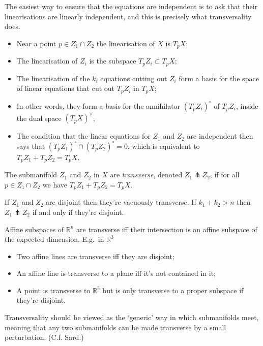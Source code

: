\documentclass[a4paper,11pt]{article}
\begin{document}
	The easiest way to ensure that the equations are independent is to ask that their linearisations are linearly independent, and this is precisely what transversality does.

	\begin{itemize}
		\item Near a point $p \in Z_1 \cap Z_2$ the linearisation of $X$ is $T_p X$;
		\item The linearisation of $Z_i$ is the subspace $T_p Z_i \subset T_p X$;
		\item The linearisation of the $k_i$ equations cutting out $Z_i$ form a basis for the space of linear equations that cut out $T_p Z_i$ in $T_p X$;
		\item In other words, they form a basis for the annihilator $(T_p Z_i)^\circ$ of $T_p Z_i$, inside the dual space $(T_p X)^{\vee}$;
		\item The condition that the linear equations for $Z_1$ and $Z_2$ are independent then says that $(T_p Z_1)^\circ \cap (T_p Z_2)^\circ = 0$, which is equivalent to $T_p Z_1 + T_p Z_2 = T_p X$.  
	\end{itemize}
	\begin{defi}
		The submanifold $Z_1$ and $Z_2$ in $X$ are \emph{transverse}, denoted $Z_1 \pitchfork Z_2$, if for all $p \in Z_1 \cap Z_2$ we have $T_p Z_1 + T_p Z_2 = T_p X$.
	\end{defi}

	\begin{ex}
		If $Z_1$ and $Z_2$ are disjoint then they're vacuously transverse. If $k_1 + k_2 > n$ then $Z_1 \pitchfork Z_2$ if and only if they're disjoint.
	\end{ex}

	\begin{ex}
		Affine subspaces of $\mathbb{R}^n$ are transverse iff their intersection is an affine subspace of the expected dimension. E.g.\ in $\mathbb{R}^3$
		\begin{itemize}
			\item Two affine lines are transverse iff they are disjoint;
			\item An affine line is transverse to a plane iff it's not contained in it;
			\item A point is transverse to $\mathbb{R}^3$ but is only transverse to a proper subspace if they're disjoint.
		\end{itemize}
	\end{ex}
	\begin{rmk}
		Transversality should be viewed as the `generic' way in which submanifolds meet, meaning that any two submanifolds can be made transverse by a small perturbation. (C.f. Sard.)
	\end{rmk}
\end{document}
